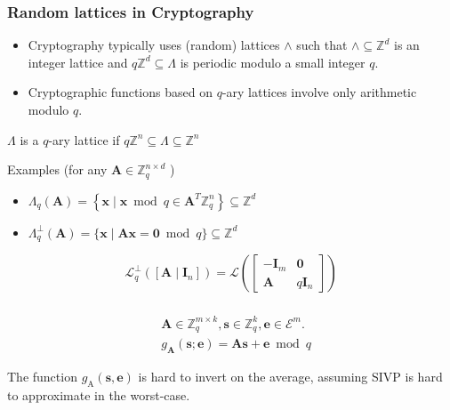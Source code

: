 \documentclass{beamer}
\begin{document}
\begin{frame}
	\frametitle{Random lattices in Cryptography}
	\begin{itemize}
		\item Cryptography typically uses (random) lattices $\wedge$ such that
 $\wedge \subseteq \mathbb{Z}^d$ is an integer lattice
and $q \mathbb{Z}^d \subseteq \Lambda$ is periodic modulo a small integer $q$.
\item Cryptographic functions based on $q$-ary lattices involve only arithmetic modulo $q$.
	\end{itemize}
	
	\begin{definition}
$\Lambda$ is a $q$-ary lattice if $q \mathbb{Z}^n \subseteq \Lambda \subseteq \mathbb{Z}^n$
	\end{definition}
	Examples (for any $\mathbf{A} \in \mathbb{Z}_q^{n \times d}$ )
	\begin{itemize}
		\item $\Lambda_q(\mathbf{A})=\left\{\mathbf{x} \mid \mathbf{x} \bmod q \in \mathbf{A}^T \mathbb{Z}_q^n\right\} \subseteq \mathbb{Z}^d$
		\item $\Lambda_q^{\perp}(\mathbf{A})=\{\mathbf{x} \mid \mathbf{A x}=\mathbf{0} \bmod q\} \subseteq \mathbb{Z}^d$
	\end{itemize}
	
	$$
\mathcal{L}_q^{\perp}\left(\left[\mathbf{A} \mid \mathbf{I}_n\right]\right)=\mathcal{L}\left(\left[\begin{array}{cc}
-\mathbf{I}_m & \mathbf{0} \\
\mathbf{A} & q \mathbf{I}_n
\end{array}\right]\right)
$$
\end{frame}

\begin{frame}
	\frametitle{}
	$$
\begin{aligned}
& \mathbf{A} \in \mathbb{Z}_q^{m \times k}, \mathbf{s} \in \mathbb{Z}_q^k, \mathbf{e} \in \mathcal{E}^m . \\
& g_{\mathbf{A}}(\mathbf{s} ; \mathbf{e})=\mathbf{A} \mathbf{s}+\mathbf{e} \bmod q
\end{aligned}
$$
	\begin{theorem} [R'05]
The function $g_{\mathrm{A}}(\mathbf{s}, \mathbf{e})$ is hard to invert on the average, assuming SIVP is hard to approximate in the worst-case. 
	\end{theorem}

\end{frame}
\end{document}
